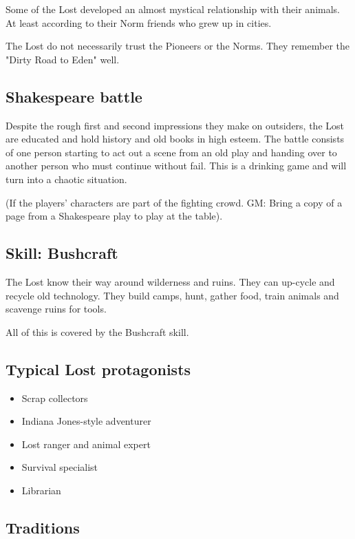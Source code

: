 Some of the Lost developed an almost mystical relationship with their animals. At least according to their Norm friends who grew up in cities.

The Lost do not necessarily trust the Pioneers or the Norms. They remember the "Dirty Road to Eden" well.

\subsection{Shakespeare battle}
\label{sec:Shakespeare battle}

Despite the rough first and second impressions they make on outsiders, the Lost are educated and hold history and old books in high esteem. The battle consists of one person starting to act out a scene from an old play and handing over to another person who must continue without fail. This is a drinking game and will turn into a chaotic situation.

(If the players' characters are part of the fighting crowd. GM: Bring a copy of a page from a Shakespeare play to play at the table).

\subsection{Skill: Bushcraft}
\label{sec:Bushcraft skill}

The Lost know their way around wilderness and ruins. They can up-cycle and recycle old technology. They build camps, hunt, gather food, train animals and scavenge ruins for tools.

All of this is covered by the Bushcraft skill.

\subsection{Typical Lost protagonists}

\begin{itemize}
    \item Scrap collectors
    \item Indiana Jones-style adventurer
    \item Lost ranger and animal expert
    \item Survival specialist
    \item Librarian
\end{itemize}

\subsection{Traditions}

